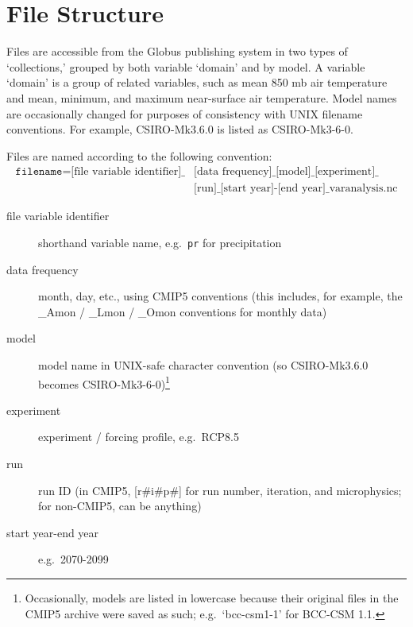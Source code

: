 \documentclass[11pt]{amsart}
\begin{document}
\section{File Structure}
Files are accessible from the Globus publishing system in two types of `collections,' grouped by both variable `domain' and by model. A variable `domain' is a group of related variables, such as mean 850 mb air temperature and mean, minimum, and maximum near-surface air temperature. Model names are occasionally changed for purposes of consistency with UNIX filename conventions. For example, CSIRO-Mk3.6.0 is listed as CSIRO-Mk3-6-0. 

Files are named according to the following convention: 
\begin{equation}
\begin{split}
\texttt{filename} = \text{[file variable identifier]\_}&\text{[data frequency]\_[model]\_[experiment]\_}\\
&\text{[run]\_[start year]-[end year]\_varanalysis.nc}
\end{split}
\end{equation}
\begin{description}
\item [file variable identifier] shorthand variable name, e.g.\ \texttt{pr} for precipitation
\item [data frequency] month, day, etc., using CMIP5 conventions (this includes, for example, the \_Amon / \_Lmon / \_Omon conventions for monthly data)
\item [model] model name in UNIX-safe character convention (so CSIRO-Mk3.6.0 becomes CSIRO-Mk3-6-0)\footnote{Occasionally, models are listed in lowercase because their original files in the CMIP5 archive were saved as such; e.g.\ `bcc-csm1-1' for BCC-CSM 1.1.} 
\item [experiment] experiment / forcing profile, e.g.\ RCP8.5
\item [run] run ID (in CMIP5, [r\#i\#p\#] for run number, iteration, and microphysics; for non-CMIP5, can be anything)
\item [start year-end year] e.g.\ 2070-2099
\end{description}
\end{document}
